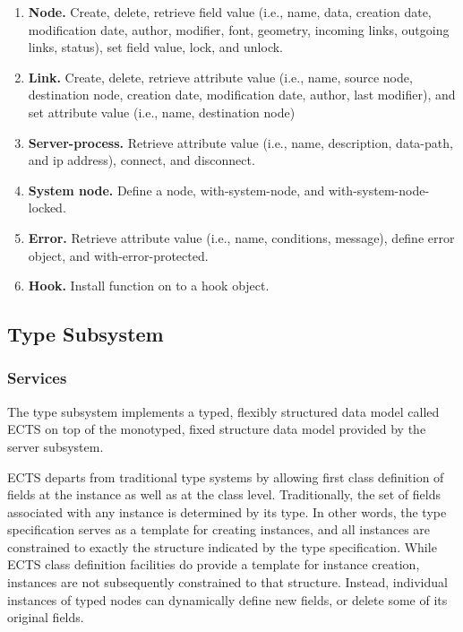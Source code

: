 \begin{enumerate}
\item {\bf Node.} Create, delete, retrieve field value (i.e., name, data,
  creation date, modification date, author, modifier, font, geometry,
  incoming links, outgoing links, status), set field value, lock, and
  unlock.
  
\item {\bf Link.} Create, delete, retrieve attribute value (i.e.,
  name, source node, destination node, creation date, modification
  date, author, last modifier), and set attribute value (i.e., name,
  destination node)
  
\item {\bf Server-process.} Retrieve attribute value (i.e., name,
  description, data-path, and ip address), connect, and disconnect.

\item {\bf System node.} Define a node, with-system-node, and
  with-system-node-locked. 

\item {\bf Error.} Retrieve attribute value (i.e., name, conditions,
  message), define error object, and with-error-protected. 

\item {\bf Hook.} Install function on to a hook object.
\end{enumerate}


\subsection {Type Subsystem}

\subsubsection{Services}

The type subsystem implements a typed, flexibly structured data
model called ECTS on top of the monotyped, fixed structure data model
provided by the server subsystem. 

ECTS departs from traditional type systems by allowing first class
definition of fields at the instance as well as at the class level.
Traditionally, the set of fields associated with any instance is
determined by its type. In other words, the type specification serves
as a template for creating instances, and all instances are
constrained to exactly the structure indicated by the type
specification.  While ECTS class definition facilities do provide a
template for instance creation, instances are not subsequently
constrained to that structure. Instead, individual instances of typed
nodes can dynamically define new fields, or delete some of its
original fields.


